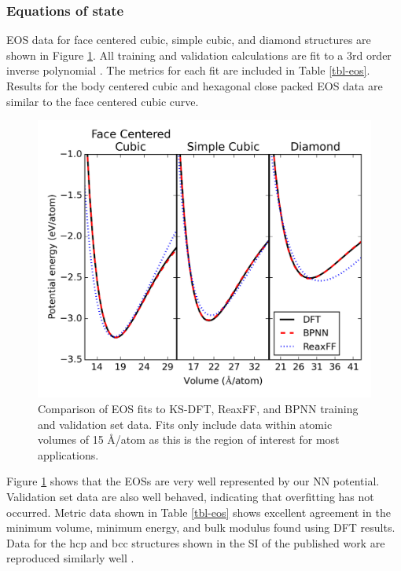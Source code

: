 \documentclass[12pt]{cmuthesis}
\begin{document}
\subsubsection{Equations of state}
\label{sec:orga837085}
EOS data for face centered cubic, simple cubic, and diamond structures are shown in Figure \ref{fig-bulk-eos}. All training and validation calculations are fit to a 3rd order inverse polynomial \cite{alchagirov-2003-reply-commen}. The metrics for each fit are included in Table \ref{tbl-eos}. Results for the body centered cubic and hexagonal close packed EOS data are similar to the face centered cubic curve.

\begin{figure}[h]
\centering
\includegraphics[width=5in]{./images/fig-bulk-eos.png}
\caption{\label{fig-bulk-eos}
Comparison of EOS fits to KS-DFT, ReaxFF, and BPNN training and validation set data. Fits only include data within atomic volumes of \textpm{} 15 \AA{}/atom as this is the region of interest for most applications.}
\end{figure}

Figure \ref{fig-bulk-eos} shows that the EOSs are very well represented by our NN potential. Validation set data are also well behaved, indicating that overfitting has not occurred. Metric data shown in Table \ref{tbl-eos} shows excellent agreement in the minimum volume, minimum energy, and bulk modulus found using DFT results. Data for the hcp and bcc structures shown in the SI of the published work are reproduced similarly well \cite{boes-2016-neural-networ}.
\end{document}
